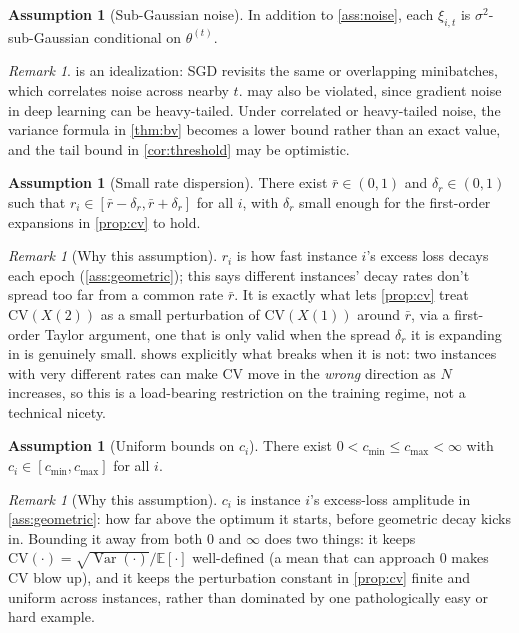 \documentclass{article}
\theoremstyle{plain}
\theoremstyle{definition}
\newtheorem{assumption}[theorem]{Assumption}
\theoremstyle{remark}
\newtheorem{remark}[theorem]{Remark}
\DeclareMathOperator{\Var}{Var}
\newcommand{\CV}{\mathrm{CV}}
\begin{document}
\begin{assumption}[Sub-Gaussian noise]
\label{ass:subgaussian}
In addition to \cref{ass:noise}, each $\xi_{i,t}$ is $\sigma^2$-sub-Gaussian conditional on $\theta^{(t)}$.
\end{assumption}

\begin{remark}
\label{rem:noise-realism}
 is an idealization: SGD revisits the same or overlapping minibatches, which correlates noise across nearby $t$.  may also be violated, since gradient noise in deep learning can be heavy-tailed. Under correlated or heavy-tailed noise, the variance formula in \cref{thm:bv} becomes a lower bound rather than an exact value, and the tail bound in \cref{cor:threshold} may be optimistic.
\end{remark}

\begin{assumption}[Small rate dispersion]
\label{ass:dispersion}
There exist $\bar r \in (0,1)$ and $\delta_r \in (0,1)$ such that $r_i \in [\bar r - \delta_r, \bar r + \delta_r]$ for all $i$, with $\delta_r$ small enough for the first-order expansions in \cref{prop:cv} to hold.
\end{assumption}

\begin{remark}[Why this assumption]
\label{rem:dispersion-why}
$r_i$ is how fast instance $i$'s excess loss decays each epoch (\cref{ass:geometric}); this says different instances' decay rates don't spread too far from a common rate $\bar r$. It is exactly what lets \cref{prop:cv} treat $\CV(X(2))$ as a small perturbation of $\CV(X(1))$ around $\bar r$, via a first-order Taylor argument, one that is only valid when the spread $\delta_r$ it is expanding in is genuinely small.  shows explicitly what breaks when it is not: two instances with very different rates can make CV move in the \emph{wrong} direction as $N$ increases, so this is a load-bearing restriction on the training regime, not a technical nicety.
\end{remark}

\begin{assumption}[Uniform bounds on $c_i$]
\label{ass:cbounds}
There exist $0 < c_{\min} \le c_{\max} < \infty$ with $c_i \in [c_{\min},c_{\max}]$ for all $i$.
\end{assumption}

\begin{remark}[Why this assumption]
\label{rem:cbounds-why}
$c_i$ is instance $i$'s excess-loss amplitude in \cref{ass:geometric}: how far above the optimum it starts, before geometric decay kicks in. Bounding it away from both $0$ and $\infty$ does two things: it keeps $\CV(\cdot)=\sqrt{\Var(\cdot)}/\mathbb E[\cdot]$ well-defined (a mean that can approach $0$ makes CV blow up), and it keeps the perturbation constant in \cref{prop:cv} finite and uniform across instances, rather than dominated by one pathologically easy or hard example.
\end{remark}
\end{document}
